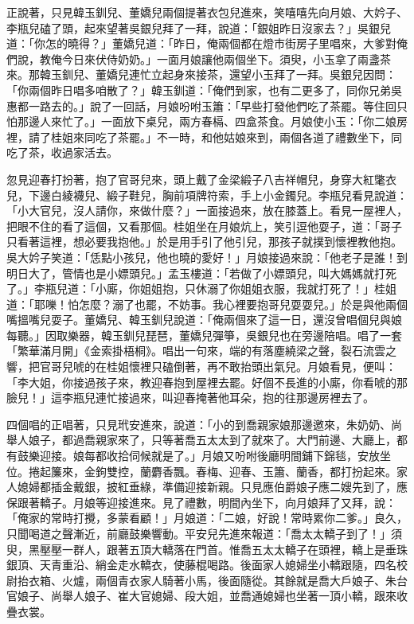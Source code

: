 正說著，只見韓玉釧兒、董嬌兒兩個提著衣包兒進來，笑嘻嘻先向月娘、大妗子、李瓶兒磕了頭，起來望著吳銀兒拜了一拜，說道：「銀姐昨日沒家去？」吳銀兒道：「你怎的曉得？」董嬌兒道：「昨日，俺兩個都在燈市街房子里唱來，大爹對俺們說，教俺今日來伏侍奶奶。」一面月娘讓他兩個坐下。須臾，小玉拿了兩盞茶來。那韓玉釧兒、董嬌兒連忙立起身來接茶，還望小玉拜了一拜。吳銀兒因問：「你兩個昨日唱多咱散了？」韓玉釧道：「俺們到家，也有二更多了，同你兄弟吳惠都一路去的。」說了一回話，月娘吩咐玉簫：「早些打發他們吃了茶罷。等住回只怕那邊人來忙了。」一面放下桌兒，兩方春槅、四盒茶食。月娘使小玉：「你二娘房裡，請了桂姐來同吃了茶罷。」不一時，和他姑娘來到，兩個各道了禮數坐下，同吃了茶，收過家活去。

忽見迎春打扮著，抱了官哥兒來，頭上戴了金梁緞子八吉祥帽兒，身穿大紅氅衣兒，下邊白綾襪兒、緞子鞋兒，胸前項牌符索，手上小金鐲兒。李瓶兒看見說道：「小大官兒，沒人請你，來做什麼？」一面接過來，放在膝蓋上。看見一屋裡人，把眼不住的看了這個，又看那個。桂姐坐在月娘炕上，笑引逗他耍子，道：「哥子只看著這裡，想必要我抱他。」於是用手引了他引兒，那孩子就撲到懷裡教他抱。吳大妗子笑道：「恁點小孩兒，他也曉的愛好！」月娘接過來說：「他老子是誰！到明日大了，管情也是小嫖頭兒。」孟玉樓道：「若做了小嫖頭兒，叫大媽媽就打死了。」李瓶兒道：「小廝，你姐姐抱，只休溺了你姐姐衣服，我就打死了！」桂姐道：「耶嚛！怕怎麼？溺了也罷，不妨事。我心裡要抱哥兒耍耍兒。」於是與他兩個嘴搵嘴兒耍子。董嬌兒、韓玉釧兒說道：「俺兩個來了這一日，還沒曾唱個兒與娘每聽。」因取樂器，韓玉釧兒琵琶，董嬌兒彈箏，吳銀兒也在旁邊陪唱。唱了一套「繁華滿月開」《金索掛梧桐》。唱出一句來，端的有落塵繞梁之聲，裂石流雲之響，把官哥兒唬的在桂姐懷裡只磕倒著，再不敢抬頭出氣兒。月娘看見，便叫：「李大姐，你接過孩子來，教迎春抱到屋裡去罷。好個不長進的小廝，你看唬的那臉兒！」這李瓶兒連忙接過來，叫迎春掩著他耳朵，抱的往那邊房裡去了。

四個唱的正唱著，只見玳安進來，說道：「小的到喬親家娘那邊邀來，朱奶奶、尚舉人娘子，都過喬親家來了，只等著喬五太太到了就來了。大門前邊、大廳上，都有鼓樂迎接。娘每都收拾伺候就是了。」月娘又吩咐後廳明間鋪下錦毯，安放坐位。捲起簾來，金鉤雙控，蘭麝香飄。春梅、迎春、玉簫、蘭香，都打扮起來。家人媳婦都插金戴銀，披紅垂綠，準備迎接新親。只見應伯爵娘子應二嫂先到了，應保跟著轎子。月娘等迎接進來。見了禮數，明間內坐下，向月娘拜了又拜，說：「俺家的常時打攪，多蒙看顧！」月娘道：「二娘，好說！常時累你二爹。」良久，只聞喝道之聲漸近，前廳鼓樂響動。平安兒先進來報道：「喬太太轎子到了！」須臾，黑壓壓一群人，跟著五頂大轎落在門首。惟喬五太太轎子在頭裡，轎上是垂珠銀頂、天青重沿、綃金走水轎衣，使藤棍喝路。後面家人媳婦坐小轎跟隨，四名校尉抬衣箱、火爐，兩個青衣家人騎著小馬，後面隨從。其餘就是喬大戶娘子、朱台官娘子、尚舉人娘子、崔大官媳婦、段大姐，並喬通媳婦也坐著一頂小轎，跟來收疊衣裳。

